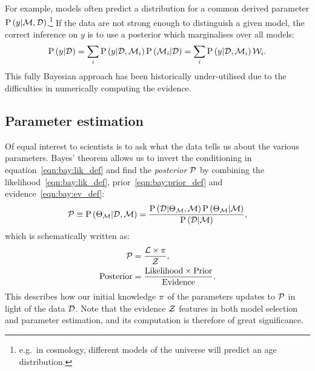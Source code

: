 For example, models often predict a distribution for a common derived parameter \(\mathrm{P}\left(y\middle|\mathcal{M},\mathcal{D}\right)\).\footnote{e.g.\ in cosmology, different models of the universe will predict an age distribution.} If the data are not strong enough to distinguish a given model, the correct inference on \(y\) is to use a posterior which marginalises over all models:
\begin{equation}
  \mathrm{P}\left(y\middle|\mathcal{D}\right) 
  = \sum_i\mathrm{P}\left(y\middle|\mathcal{D},\mathcal{M}_i\right)\mathrm{P}\left(\mathcal{M}_i\middle|\mathcal{D}\right)
  = \sum_i\mathrm{P}\left(y\middle|\mathcal{D},\mathcal{M}_i\right)\mathcal{W}_i.
\end{equation}
This fully Bayesian approach has been historically under-utilised due to the difficulties in numerically computing the evidence.



\subsection{Parameter estimation}
Of equal interest to scientists is to ask what the data tells us about the various parameters.  
Bayes' theorem allows us to invert the conditioning in equation~\eqref{eqn:bay:lik_def} and find the {\em posterior\/} \(\mathcal{P}\) by combining the likelihood~\eqref{eqn:bay:lik_def}, prior~\eqref{eqn:bay:prior_def} and evidence~\eqref{eqn:bay:ev_def}:
%
\begin{equation}
  \mathcal{P}\equiv
  \mathrm{P}\left(\Theta_{\mathcal{M}}\middle|\mathcal{D},\mathcal{M}\right) = \frac{\mathrm{P}\left(\mathcal{D}\middle|\Theta_{\mathcal{M}},\mathcal{M}\right) \mathrm{P}\left(\Theta_{\mathcal{M}}\middle|\mathcal{M}\right)}{\mathrm{P}\left(\mathcal{D}\middle|\mathcal{M}\right)},
  \label{eqn:bay:bayes_theorem}
\end{equation}
%
which is schematically written as:
\begin{align}
  \mathcal{P} &= \frac{\mathcal{L} \times \pi }{\mathcal{Z} },
  \label{eqn:bay:bayes_theorem_abbrv}\\
  \mathrm{Posterior} &= \frac{\mathrm{Likelihood} \times \mathrm{Prior} }{\mathrm{Evidence} }.
\end{align}
This describes how our initial knowledge \(\pi\) of the parameters updates to \(\mathcal{P}\) in light of the data \(\mathcal{D}\). Note that the evidence \(\mathcal{Z}\) features in both model selection and parameter estimation, and its computation is therefore of great significance.







